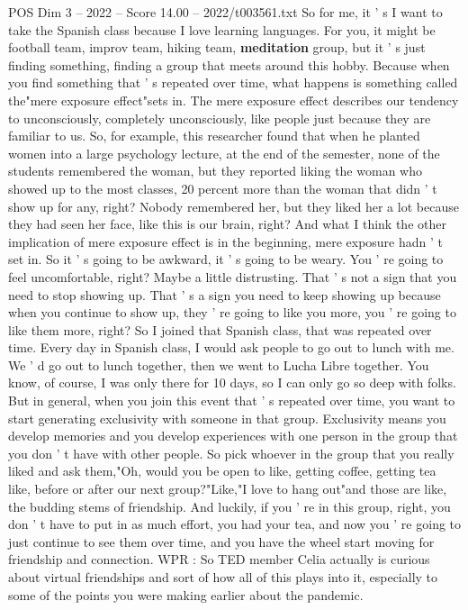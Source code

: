 \begin{textsample}{POS Dim 3 – 2022 – Score 14.00 – 2022/t003561.txt}
So for me, it ' s I want to take the Spanish class because I love learning languages.
For you, it might be football team, improv team, hiking team, \textbf{meditation} group, but it ' s just finding something, finding a group that meets around this hobby.
Because when you find something that ' s repeated over time, what happens is something called the"mere exposure effect"sets in.
The mere exposure effect describes our tendency to unconsciously, completely unconsciously, like people just because they are familiar to us.
So, for example, this researcher found that when he planted women into a large psychology lecture, at the end of the semester, none of the students remembered the woman, but they reported liking the woman who showed up to the most classes, 20 percent more than the woman that didn ' t show up for any, right?
Nobody remembered her, but they liked her a lot because they had seen her face, like this is our brain, right?
And what I think the other implication of mere exposure effect is in the beginning, mere exposure hadn ' t set in.
So it ' s going to be awkward, it ' s going to be weary.
You ' re going to feel uncomfortable, right?
Maybe a little distrusting.
That ' s not a sign that you need to stop showing up.
That ' s a sign you need to keep showing up because when you continue to show up, they ' re going to like you more, you ' re going to like them more, right?
So I joined that Spanish class, that was repeated over time.
Every day in Spanish class, I would ask people to go out to lunch with me.
We ' d go out to lunch together, then we went to Lucha Libre together.
You know, of course, I was only there for 10 days, so I can only go so deep with folks.
But in general, when you join this event that ' s repeated over time, you want to start generating exclusivity with someone in that group.
Exclusivity means you develop memories and you develop experiences with one person in the group that you don ' t have with other people.
So pick whoever in the group that you really liked and ask them,"Oh, would you be open to like, getting coffee, getting tea like, before or after our next group?"Like,"I love to hang out"and those are like, the budding stems of friendship.
And luckily, if you ' re in this group, right, you don ' t have to put in as much effort, you had your tea, and now you ' re going to just continue to see them over time, and you have the wheel start moving for friendship and connection.
WPR : So TED member Celia actually is curious about virtual friendships and sort of how all of this plays into it, especially to some of the points you were making earlier about the pandemic.

\end{textsample}
